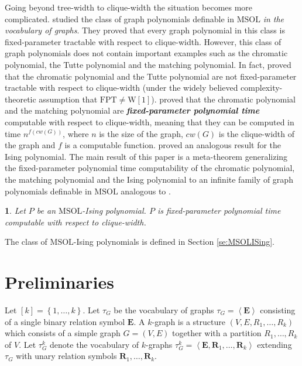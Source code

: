 \documentclass{llncs}
\newtheorem{thm}{\protect\theoremname}
\newcommand{\MSOL}{\mathrm{MSOL}}
\newcommand{\FPT}{\mathrm{FPT}}
\newcommand{\Wone}{\mathrm{W}}
\providecommand{\theoremname}{Theorem}
\begin{document}
Going beyond tree-width to clique-width the situation becomes more
complicated. \cite{ar:CMR2000} studied the class of graph polynomials
definable in $\MSOL$ {\em in the vocabulary of graphs}. They proved
that every graph polynomial in this class is fixed-parameter tractable
with respect to clique-width. However, this class of graph polynomials
does not contain important examples such as the chromatic polynomial,
the Tutte polynomial and the matching polynomial. In fact, \cite{ar:FominGolovachLokshtanov10}
proved that the chromatic polynomial and the Tutte polynomial are
not fixed-parameter tractable with respect to clique-width (under
the widely believed complexity-theoretic assumption that $\FPT\not=\Wone[1]$).
\cite{makowsky2006computing} proved that the chromatic polynomial
and the matching polynomial are {\em\bf fixed-parameter polynomial time}
computable with respect to clique-width, meaning that they can be
computed in time $n^{f(cw(G))}$, where $n$ is the size of the graph,
$cw(G)$ is the clique-width of the graph and $f$ is a computable
function. \cite{kotek2012complexity} proved an analogous result for
the Ising polynomial. The main result of this paper is a meta-theorem
generalizing the fixed-parameter polynomial time computability of
the chromatic polynomial, the matching polynomial and the Ising polynomial
to an infinite family of graph polynomials definable in $\MSOL$ analogous
to \cite{ar:CMR2000}. 
\begin{thm}
Let $P$ be an $\MSOL$-Ising polynomial. $P$ is fixed-parameter polynomial
time computable with respect to clique-width. 
\end{thm}
The class of $\MSOL$-Ising polynomials is defined in Section \ref{se:MSOLISing}. 


\section{Preliminaries}

Let $[k]=\left\{ 1,\ldots,k\right\}$. Let $\tau_{G}$ be the vocabulary
of graphs $\tau_{G}=\left\langle \mathbf{E}\right\rangle $ consisting
of a single binary relation symbol $\mathbf{E}$. A $k$-graph is a structure $(V,E,R_1,\ldots,R_k)$ which consists of a simple graph $G=(V,E)$ together with a partition $R_1,\ldots,R_k$ of $V$.  Let
$\tau_{G}^{k}$ denote the vocabulary of $k$-graphs $\tau_{G}^{k}=\left\langle \mathbf{E},\mathbf{R}_{1},\ldots,\mathbf{R}_{k}\right\rangle $
extending $\tau_{G}$ with unary relation symbols $\mathbf{R}_{1},\ldots,\mathbf{R}_{k}$. 
\end{document}
